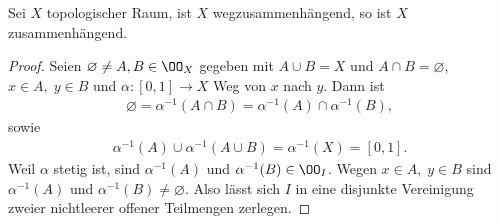 \begin{prop}
\label{prop:2.2.24}
Sei $X$ topologischer Raum, ist $X$ wegzusammenhängend, so ist $X$
zusammenhängend.\fishhere
\end{prop}
\begin{proof}
Seien $\varnothing\neq A,B\in\OO_X$ gegeben mit $A\cup B = X$ und $A\cap B =
\varnothing$, $x\in A,\;y\in B$ und $\alpha:[0,1]\to X$ Weg von $x$ nach
$y$. Dann ist 
\begin{align*}
\varnothing = \alpha^{-1}(A\cap B) = \alpha^{-1}(A)\cap
\alpha^{-1}(B),
\end{align*}
sowie
\begin{align*}
\alpha^{-1}(A)\cup\alpha^{-1}(A\cup B) = \alpha^{-1}(X) =
[0,1].
\end{align*}
Weil $\alpha$ stetig ist, sind $\alpha^{-1}(A)$ und $\alpha^{-1}(B) \in
\OO_I$. Wegen $x\in A,\;y\in B$ sind $\alpha^{-1}(A)$ und $\alpha^{-1}(B)\neq
\varnothing$. Also lässt sich $I$ in eine disjunkte Vereinigung zweier
nichtleerer offener Teilmengen zerlegen.\dipper\qedhere 
\end{proof}


